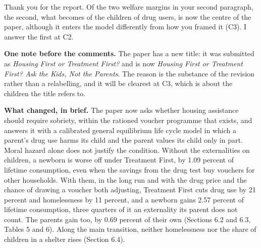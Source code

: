 \documentclass[11pt]{article}
\begin{document}

Thank you for the report. Of the two welfare margins in your second paragraph, the
second, what becomes of the children of drug users, is now the centre of the paper,
although it enters the model differently from how you framed it (C3). I answer the
first at C2.


{\color{respred}
\textbf{One note before the comments.} The paper has a new title: it was submitted as
\emph{Housing First or Treatment First?} and is now \emph{Housing First or Treatment First? Ask the Kids, Not the Parents}. The reason is the substance of the revision rather than a relabelling, and it
will be clearest at C3, which is about the children the title refers to.

\textbf{What changed, in brief.} The paper now asks whether housing assistance should
require sobriety, within the rationed voucher programme that exists, and answers it with
a calibrated general equilibrium life cycle model in which a parent's drug use harms its
child and the parent values its child only in part. Moral hazard alone does not justify
the condition. Without the externalities on children, a newborn is worse off under
Treatment First, by 1.09 percent of lifetime consumption, even when the savings from the
drug test buy vouchers for other households. With them, in the long run and with the drug
price and the chance of drawing a voucher both adjusting, Treatment First cuts drug use by
21 percent and homelessness by 11 percent, and a newborn gains 2.57 percent of lifetime
consumption, three quarters of it an externality its parent does not count. The parents
gain too, by 0.69 percent of their own (Sections 6.2 and 6.3, Tables 5 and 6). Along the
main transition, neither homelessness nor the share of children in a shelter rises
(Section 6.4).

}
\end{document}
